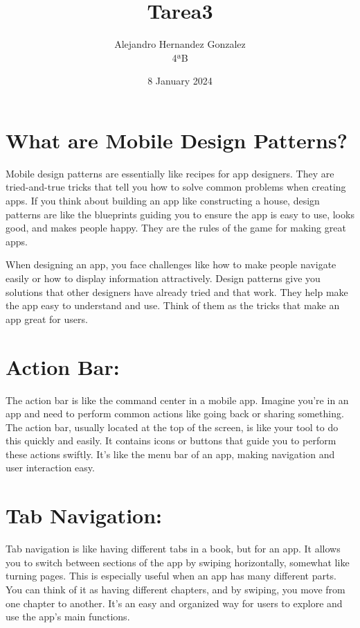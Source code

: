 \documentclass{article}
\title{Tarea3}
\author{Alejandro Hernandez Gonzalez\\ 
4ªB}
\date{8 January 2024}
\begin{document}
\maketitle

\section*{What are Mobile Design Patterns?}

Mobile design patterns are essentially like recipes for app designers. They are tried-and-true tricks that tell you how to solve common problems when creating apps. If you think about building an app like constructing a house, design patterns are like the blueprints guiding you to ensure the app is easy to use, looks good, and makes people happy. They are the rules of the game for making great apps.

When designing an app, you face challenges like how to make people navigate easily or how to display information attractively. Design patterns give you solutions that other designers have already tried and that work. They help make the app easy to understand and use. Think of them as the tricks that make an app great for users.

\section*{Action Bar:}

The action bar is like the command center in a mobile app. Imagine you're in an app and need to perform common actions like going back or sharing something. The action bar, usually located at the top of the screen, is like your tool to do this quickly and easily. It contains icons or buttons that guide you to perform these actions swiftly. It's like the menu bar of an app, making navigation and user interaction easy.

\section*{Tab Navigation:}

Tab navigation is like having different tabs in a book, but for an app. It allows you to switch between sections of the app by swiping horizontally, somewhat like turning pages. This is especially useful when an app has many different parts. You can think of it as having different chapters, and by swiping, you move from one chapter to another. It's an easy and organized way for users to explore and use the app's main functions.
\end{document}
